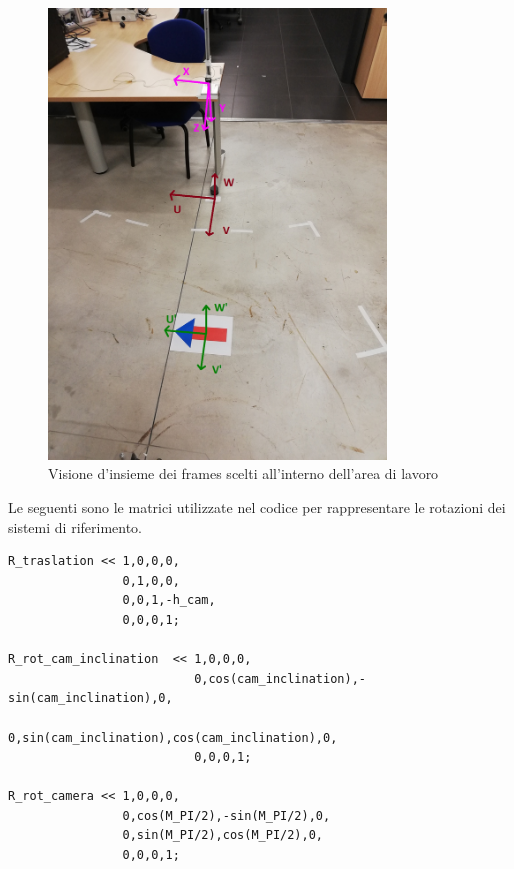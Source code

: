 \begin{figure}[H]
	\centering
	\includegraphics[width=0.8\textwidth]{Immagini/camera_opposite_pov.jpg}
	\caption{Visione d'insieme dei frames scelti all'interno dell'area di lavoro}
	\label{fig:all_frames}
\end{figure}

Le seguenti sono le matrici utilizzate nel codice per rappresentare le rotazioni dei sistemi di riferimento.
\begin{lstlisting}
R_traslation << 1,0,0,0,
				0,1,0,0,
				0,0,1,-h_cam,
				0,0,0,1;

R_rot_cam_inclination  << 1,0,0,0,
					      0,cos(cam_inclination),-sin(cam_inclination),0,
						  0,sin(cam_inclination),cos(cam_inclination),0,
						  0,0,0,1;

R_rot_camera << 1,0,0,0,
				0,cos(M_PI/2),-sin(M_PI/2),0,
				0,sin(M_PI/2),cos(M_PI/2),0,
				0,0,0,1;
\end{lstlisting}
